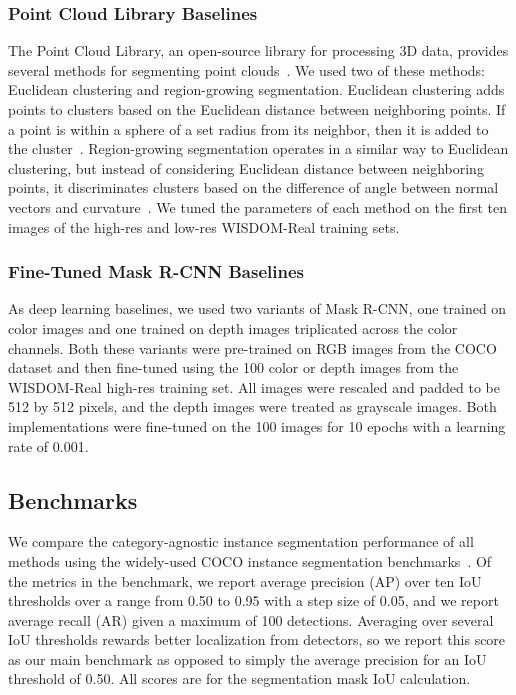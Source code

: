 \documentclass[letterpaper, 10 pt, conference]{ieeeconf}  \pdfoutput=1
\numberwithin{equation}{section}
\begin{document}
\subsubsection{Point Cloud Library Baselines}
The Point Cloud Library, an open-source library for processing 3D data, provides several methods for segmenting point clouds~\cite{rusu20113d}. We used two of these methods: Euclidean clustering and region-growing segmentation. Euclidean clustering adds points to clusters based on the Euclidean distance between neighboring points. If a point is within a sphere of a set radius from its neighbor, then it is added to the cluster~\cite{rusu2010semantic}. Region-growing segmentation operates in a similar way to Euclidean clustering, but instead of considering Euclidean distance between neighboring points, it discriminates clusters based on the difference of angle between normal vectors and curvature~\cite{vo2015octree,rabbani2006segmentation}. We tuned the parameters of each method on the first ten images of the high-res and low-res WISDOM-Real training sets.

\subsubsection{Fine-Tuned Mask R-CNN Baselines}
As deep learning baselines, we used two variants of Mask R-CNN, one trained on color images and one trained on depth images triplicated across the color channels. Both these variants were pre-trained on RGB images from the COCO dataset and then fine-tuned using the 100 color or depth images from the WISDOM-Real high-res training set. All images were rescaled and padded to be 512 by 512 pixels, and the depth images were treated as grayscale images. Both implementations were fine-tuned on the 100 images for 10 epochs with a learning rate of 0.001.

\subsection{Benchmarks}
We compare the category-agnostic instance segmentation performance of all methods using the widely-used COCO instance segmentation benchmarks~\cite{lin2014microsoft}.
Of the metrics in the benchmark, we report average precision (AP) over ten IoU thresholds over a range from 0.50 to 0.95 with a step size of 0.05, and we report average recall (AR) given a maximum of 100 detections.
Averaging over several IoU thresholds rewards better localization from detectors, so we report this score as our main benchmark as opposed to simply the average precision for an IoU threshold of 0.50. All scores are for the segmentation mask IoU calculation. 
\end{document}
